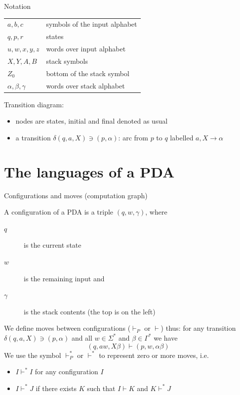 \documentclass[handout]{beamer}
\begin{document}
\begin{frame}{Notation}

    \begin{center}
        \begin{tabular}{l l}
            $a,b,c$ & symbols of the input alphabet\\
            $q,p, r$ & states\\
            $u,w,x,y,z$ & words over input alphabet\\
            $X,Y,A,B$ & stack symbols\\
            $Z_0$ & bottom of the stack symbol\\
            $\alpha,\beta,\gamma$ & words over stack alphabet		
        \end{tabular}
    \end{center}

    \bigskip

    Transition diagram:
    \begin{itemize}
        \item nodes are states, initial and final denoted as usual
        \item a transition $\delta(q,a,X)\ni (p,\alpha)$: arc from $p$ to $q$ labelled $a,X\rightarrow \alpha$          
    \end{itemize}

\end{frame}


\section*{The languages of a PDA}


\begin{frame}{Configurations and moves (computation graph)}

    A \alert{configuration} of a PDA is a triple \alert{$(q,w,\gamma)$}, where
    \begin{description}
        \item[$q$] is the current state 
        \item[$w$] is the remaining input and
        \item[$\gamma$] is the stack contents (the top is on the left) 
    \end{description}

    We define \alert{moves} between configurations (\alert{$\vdash_P$} or \alert{$\vdash$}) thus: for any transition $\delta(q,a,X)\ni(p,\alpha)$ and all $w\in \Sigma^*$ and $\beta\in \Gamma^*$ we have
    $$
    (q,aw,X\beta)\vdash (p,w,\alpha\beta)
    $$
    We use the symbol \alert{$\vdash^*_P$} or \alert{$\vdash^*$} to represent zero or more moves, i.e.
    \begin{itemize}
        \item $I\vdash^*I$ for any configuration $I$
        \item $I\vdash^*J$ if there exists $K$ such that $I\vdash K$ and $K\vdash^*J$
    \end{itemize}

\end{frame}
\end{document}
